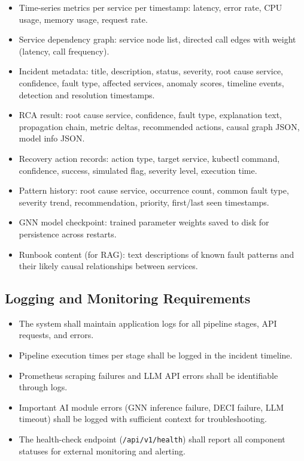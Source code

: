 \documentclass[11pt,a4paper]{article}
\begin{document}
\begin{itemize}
    \item Time-series metrics per service per timestamp: latency, error rate, CPU usage, memory usage, request rate.
    \item Service dependency graph: service node list, directed call edges with weight (latency, call frequency).
    \item Incident metadata: title, description, status, severity, root cause service, confidence, fault type, affected services, anomaly scores, timeline events, detection and resolution timestamps.
    \item RCA result: root cause service, confidence, fault type, explanation text, propagation chain, metric deltas, recommended actions, causal graph JSON, model info JSON.
    \item Recovery action records: action type, target service, kubectl command, confidence, success, simulated flag, severity level, execution time.
    \item Pattern history: root cause service, occurrence count, common fault type, severity trend, recommendation, priority, first/last seen timestamps.
    \item GNN model checkpoint: trained parameter weights saved to disk for persistence across restarts.
    \item Runbook content (for RAG): text descriptions of known fault patterns and their likely causal relationships between services.
\end{itemize}


\subsection{Logging and Monitoring Requirements}

\begin{itemize}
    \item The system shall maintain application logs for all pipeline stages, API requests, and errors.
    \item Pipeline execution times per stage shall be logged in the incident timeline.
    \item Prometheus scraping failures and LLM API errors shall be identifiable through logs.
    \item Important AI module errors (GNN inference failure, DECI failure, LLM timeout) shall be logged with sufficient context for troubleshooting.
    \item The health-check endpoint (\texttt{/api/v1/health}) shall report all component statuses for external monitoring and alerting.
\end{itemize}
\end{document}
